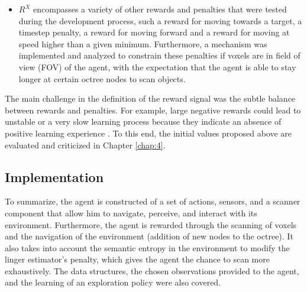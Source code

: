 \begin{itemize}
     
    \item $R^{X}$ encompasses a variety of other rewards and penalties that were tested during the development process, such a reward for moving towards a target, a timestep penalty, a reward for moving forward and a reward for moving at speed higher than a given minimum. Furthermore, a mechanism was implemented and analyzed to constrain these penalties if voxels are in field of view (FOV) of the agent, with the expectation that the agent is able to stay longer at certain octree nodes to scan objects. 
\end{itemize}

The main challenge in the definition of the reward signal was the subtle balance between rewards and penalties. For example, large negative rewards could lead to unstable or a very slow learning process because they indicate an absence of positive learning experience \cite{sutton2018reinforcement}. To this end, the initial values proposed above are evaluated and criticized in Chapter \ref{chap:4}.



\subsection{Implementation}
To summarize, the agent is constructed of a set of actions, sensors, and a scanner component that allow him to navigate, perceive, and interact with its environment. Furthermore, the agent is rewarded through the scanning of voxels and the navigation of the environment (addition of new nodes to the octree). It also takes into account the semantic entropy in the environment to modify the linger estimator's penalty, which gives the agent the chance to scan more exhaustively. The data structures, the chosen observations provided to the agent, and the learning of an exploration policy were also covered. 

